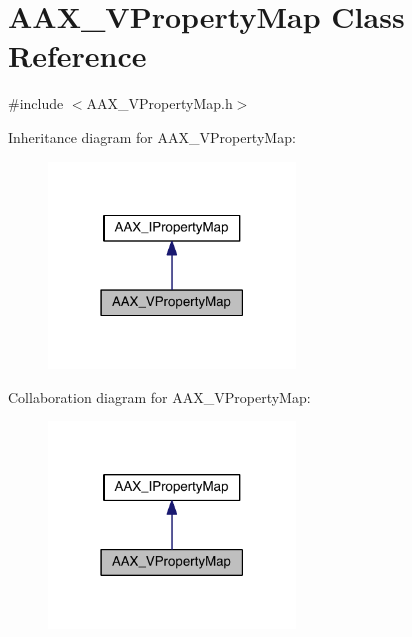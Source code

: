 \hypertarget{a00140}{}\section{A\+A\+X\+\_\+\+V\+Property\+Map Class Reference}
\label{a00140}


{\ttfamily \#include $<$A\+A\+X\+\_\+\+V\+Property\+Map.\+h$>$}



Inheritance diagram for A\+A\+X\+\_\+\+V\+Property\+Map\+:
\nopagebreak
\begin{figure}[H]
\begin{center}
\leavevmode
\includegraphics[width=186pt]{a00716}
\end{center}
\end{figure}


Collaboration diagram for A\+A\+X\+\_\+\+V\+Property\+Map\+:
\nopagebreak
\begin{figure}[H]
\begin{center}
\leavevmode
\includegraphics[width=186pt]{a00717}
\end{center}
\end{figure}


